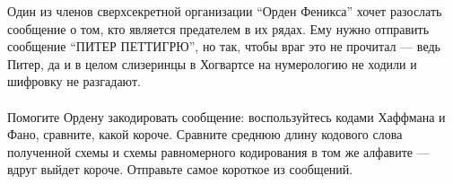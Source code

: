 \question
Один из членов сверхсекретной организации “Орден Феникса” хочет разослать сообщение о том, кто является предателем в их рядах. Ему нужно отправить сообщение “ПИТЕР ПЕТТИГРЮ”, но так, чтобы враг это не прочитал — ведь Питер, да и в целом слизеринцы в Хогвартсе на нумерологию не ходили и шифровку не разгадают.
\\
\\
Помогите Ордену закодировать сообщение: воспользуйтесь кодами Хаффмана и Фано, сравните, какой короче. Сравните среднюю длину кодового слова полученной схемы и схемы равномерного кодирования в том же алфавите — вдруг выйдет короче. Отправьте самое короткое из сообщений.